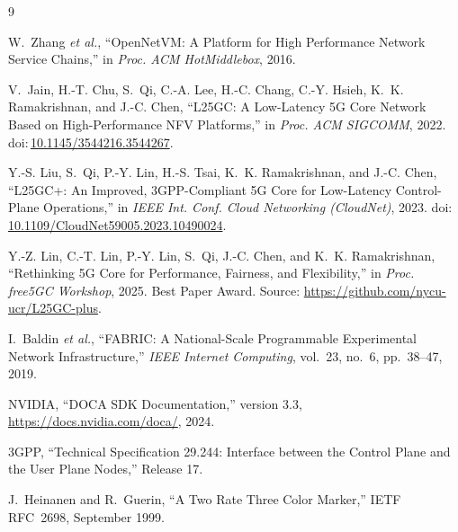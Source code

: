\documentclass[conference]{IEEEtran}
\begin{document}
\begin{thebibliography}{9}

  W.~Zhang \emph{et al.},
  ``OpenNetVM: A Platform for High Performance Network Service Chains,''
  in \emph{Proc. ACM HotMiddlebox}, 2016.

  V.~Jain, H.-T. Chu, S.~Qi, C.-A. Lee, H.-C. Chang, C.-Y. Hsieh,
  K.~K. Ramakrishnan, and J.-C. Chen,
  ``L25GC: A Low-Latency 5G Core Network Based on High-Performance
  NFV Platforms,''
  in \emph{Proc. ACM SIGCOMM}, 2022.
  doi:\,\href{https://doi.org/10.1145/3544216.3544267}{10.1145/3544216.3544267}.

  Y.-S. Liu, S.~Qi, P.-Y. Lin, H.-S. Tsai, K.~K. Ramakrishnan,
  and J.-C. Chen,
  ``L25GC+: An Improved, 3GPP-Compliant 5G Core for Low-Latency
  Control-Plane Operations,''
  in \emph{IEEE Int. Conf. Cloud Networking (CloudNet)}, 2023.
  doi:\,\href{https://doi.org/10.1109/CloudNet59005.2023.10490024}{10.1109/CloudNet59005.2023.10490024}.

  Y.-Z. Lin, C.-T. Lin, P.-Y. Lin, S.~Qi, J.-C. Chen, and
  K.~K. Ramakrishnan,
  ``Rethinking 5G Core for Performance, Fairness, and Flexibility,''
  in \emph{Proc. free5GC Workshop}, 2025.  Best Paper Award.  Source:
  \url{https://github.com/nycu-ucr/L25GC-plus}.

  I.~Baldin \emph{et al.},
  ``FABRIC: A National-Scale Programmable Experimental Network Infrastructure,''
  \emph{IEEE Internet Computing}, vol.~23, no.~6, pp.~38--47, 2019.

  NVIDIA,
  ``DOCA SDK Documentation,'' version 3.3,
  \url{https://docs.nvidia.com/doca/}, 2024.

  3GPP,
  ``Technical Specification 29.244: Interface between the Control Plane and
  the User Plane Nodes,'' Release 17.

  J.~Heinanen and R.~Guerin,
  ``A Two Rate Three Color Marker,''
  IETF RFC~2698, September 1999.

\end{thebibliography}
\end{document}

